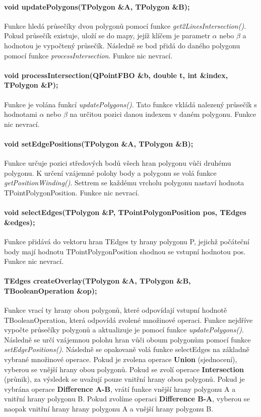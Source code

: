 \documentclass[11pt]{article}
\begin{document}
\paragraph{void updatePolygons(TPolygon \&A, TPolygon \&B);}
Funkce hledá průsečíky dvou polygonů pomocí funkce \textit{get2LinesIntersection()}. Pokud průsečík existuje, uloží se do mapy, jejíž klíčem je parametr $\alpha$ nebo $\beta$ a hodnotou je vypočtený průsečík. Následně se bod přidá do daného polygonu pomocí funkce \textit{processIntersection}. Funkce nic nevrací.

\paragraph{void processIntersection(QPointFBO \&b, double t, int \&index, TPolygon \&P);}
Funkce je volána funkcí \textit{updatePolygons()}. Tato funkce vkládá nalezený průsečík s hodnotami $\alpha$ nebo $\beta$ na určitou pozici danou indexem v daném polygonu. Funkce nic nevrací.

\paragraph{void setEdgePositions(TPolygon \&A, TPolygon \&B);}
Funkce určuje pozici středových bodů všech hran polygonu vůči druhému polygonu. K určení vzájemné polohy body a polygonu se volá funkce \textit{getPositionWinding()}. Settrem se každému vrcholu polygonu nastaví hodnota TPointPolygonPosition. Funkce nic nevrací.

\paragraph{void selectEdges(TPolygon \&P, TPointPolygonPosition pos, TEdges \&edges);}
Funkce přidává do vektoru hran TEdges ty hrany polygonu P, jejichž počáteční body mají hodnotu TPointPolygonPosition shodnou se vstupní hodnotou pos. Funkce nic nevrací.

\paragraph{TEdges createOverlay(TPolygon \&A, TPolygon \&B, TBooleanOperation \&op);}
Funkce vrací ty hrany obou polygonů, které odpovídají vstupní hodnotě TBooleanOperation, která odpovídá zvolené množinové operaci. Funkce nejdříve vypočte průsečíky polygonů a aktualizuje je pomocí funkce \textit{updatePolygons()}. Následně se určí vzájemnou polohu hran vůči oboum polygonům pomocí funkce \textit{setEdgePositions()}. Následně se opakovaně volá funkce selectEdges na základně vybrané množinové operace. Pokud je zvolena operace \textbf{Union} (sjednocení), vyberou se vnější hrany obou polygonů. Pokud se zvolí operace \textbf{Intersection} (průnik), za výsledek se uvažují pouze vnitřní hrany obou polygonů. Pokud je vybrána operace \textbf{Difference A-B}, vrátí funkce vnější hrany polygonu A a vnitřní hrany polygonu B. Pokud zvolíme operaci \textbf{Difference B-A}, vyberou se naopak vnitřní hrany hrany polygonu A a vnější hrany polygonu B.
\end{document}
